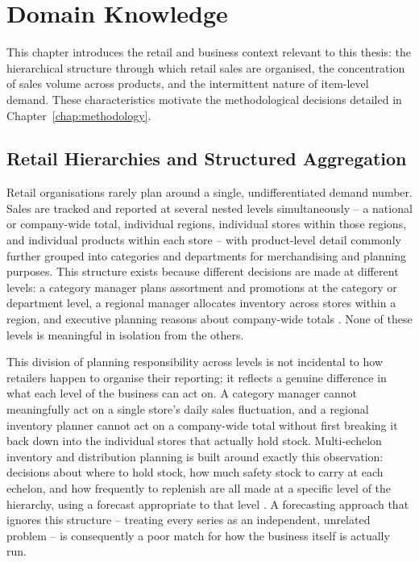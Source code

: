 %
%
%

\chapter{Domain Knowledge}
\label{chap:domainKnowledge}

This chapter introduces the retail and business context relevant to this thesis: the hierarchical structure through which retail sales are organised, the concentration of sales volume across products, and the intermittent nature of item-level demand. These characteristics motivate the methodological decisions detailed in Chapter~\ref{chap:methodology}.

\section{Retail Hierarchies and Structured Aggregation}
\label{sec:retailHierarchies}

Retail organisations rarely plan around a single, undifferentiated demand number. Sales are tracked and reported at several nested levels simultaneously -- a national or company-wide total, individual regions, individual stores within those regions, and individual products within each store -- with product-level detail commonly further grouped into categories and departments for merchandising and planning purposes. This structure exists because different decisions are made at different levels: a category manager plans assortment and promotions at the category or department level, a regional manager allocates inventory across stores within a region, and executive planning reasons about company-wide totals \cite{Chopra:2015}. None of these levels is meaningful in isolation from the others.

This division of planning responsibility across levels is not incidental to how retailers happen to organise their reporting; it reflects a genuine difference in what each level of the business can act on. A category manager cannot meaningfully act on a single store's daily sales fluctuation, and a regional inventory planner cannot act on a company-wide total without first breaking it back down into the individual stores that actually hold stock. Multi-echelon inventory and distribution planning is built around exactly this observation: decisions about where to hold stock, how much safety stock to carry at each echelon, and how frequently to replenish are all made at a specific level of the hierarchy, using a forecast appropriate to that level \cite{Silver:1998}. A forecasting approach that ignores this structure -- treating every series as an independent, unrelated problem -- is consequently a poor match for how the business itself is actually run.

